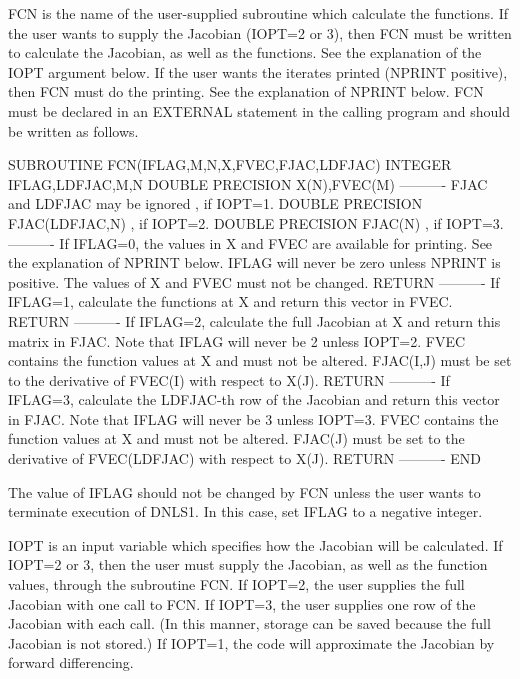 \documentclass[11pt,twoside,nolof]{starlink}
\begin{document}
\begin{terminalv}
      FCN is the name of the user-supplied subroutine which calculate
         the functions.  If the user wants to supply the Jacobian
         (IOPT=2 or 3), then FCN must be written to calculate the
         Jacobian, as well as the functions.  See the explanation
         of the IOPT argument below.
         If the user wants the iterates printed (NPRINT positive), then
         FCN must do the printing.  See the explanation of NPRINT
         below.  FCN must be declared in an EXTERNAL statement in the
         calling program and should be written as follows.


         SUBROUTINE FCN(IFLAG,M,N,X,FVEC,FJAC,LDFJAC)
         INTEGER IFLAG,LDFJAC,M,N
         DOUBLE PRECISION X(N),FVEC(M)
         ----------
         FJAC and LDFJAC may be ignored       , if IOPT=1.
         DOUBLE PRECISION FJAC(LDFJAC,N)      , if IOPT=2.
         DOUBLE PRECISION FJAC(N)             , if IOPT=3.
         ----------
           If IFLAG=0, the values in X and FVEC are available
           for printing.  See the explanation of NPRINT below.
           IFLAG will never be zero unless NPRINT is positive.
           The values of X and FVEC must not be changed.
         RETURN
         ----------
           If IFLAG=1, calculate the functions at X and return
           this vector in FVEC.
         RETURN
         ----------
           If IFLAG=2, calculate the full Jacobian at X and return
           this matrix in FJAC.  Note that IFLAG will never be 2 unless
           IOPT=2.  FVEC contains the function values at X and must
           not be altered.  FJAC(I,J) must be set to the derivative
           of FVEC(I) with respect to X(J).
         RETURN
         ----------
           If IFLAG=3, calculate the LDFJAC-th row of the Jacobian
           and return this vector in FJAC.  Note that IFLAG will
           never be 3 unless IOPT=3.  FVEC contains the function
           values at X and must not be altered.  FJAC(J) must be
           set to the derivative of FVEC(LDFJAC) with respect to X(J).
         RETURN
         ----------
         END


         The value of IFLAG should not be changed by FCN unless the
         user wants to terminate execution of DNLS1.  In this case, set
         IFLAG to a negative integer.


       IOPT is an input variable which specifies how the Jacobian will
         be calculated.  If IOPT=2 or 3, then the user must supply the
         Jacobian, as well as the function values, through the
         subroutine FCN.  If IOPT=2, the user supplies the full
         Jacobian with one call to FCN.  If IOPT=3, the user supplies
         one row of the Jacobian with each call.  (In this manner,
         storage can be saved because the full Jacobian is not stored.)
         If IOPT=1, the code will approximate the Jacobian by forward
         differencing.


\end{terminalv}
\end{document}
